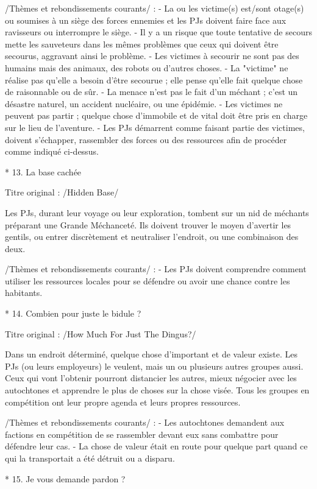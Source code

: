 \begin{enumerate}
/Thèmes et rebondissements courants/ :
- La ou les victime(s) est/sont otage(s) ou soumises à un siège des forces ennemies et les PJs doivent faire face aux ravisseurs ou interrompre le siège.
- Il y a un risque que toute tentative de secours mette les sauveteurs dans les mêmes problèmes que ceux qui doivent être secourus, aggravant ainsi le problème.
- Les victimes à secourir ne sont pas des humains mais des animaux, des robots ou d'autres choses.
- La "victime" ne réalise pas qu'elle a besoin d'être secourue ; elle pense qu'elle fait quelque chose de raisonnable ou de sûr.
- La menace n'est pas le fait d'un méchant ; c'est un désastre naturel, un accident nucléaire, ou une épidémie.
- Les victimes ne peuvent pas partir ; quelque chose d'immobile et de vital doit être pris en charge sur le lieu de l'aventure.
- Les PJs démarrent comme faisant partie des victimes, doivent s'échapper, rassembler des forces ou des ressources afin de procéder comme indiqué ci-dessus.

* 13. La base cachée

Titre original : /Hidden Base/

Les PJs, durant leur voyage ou leur exploration, tombent sur un nid de méchants préparant une Grande Méchanceté. Ils doivent trouver le moyen d'avertir les gentils, ou entrer discrètement et neutraliser l'endroit, ou une combinaison des deux.

/Thèmes et rebondissements courants/ :
- Les PJs doivent comprendre comment utiliser les ressources locales pour se défendre ou avoir une chance contre les habitants.

* 14. Combien pour juste le bidule ?

Titre original : /How Much For Just The Dingus?/

Dans un endroit déterminé, quelque chose d'important et de valeur existe. Les PJs (ou leurs employeurs) le veulent, mais un ou plusieurs autres groupes aussi. Ceux qui vont l'obtenir pourront distancier les autres, mieux négocier avec les autochtones et apprendre le plus de choses sur la chose visée. Tous les groupes en compétition ont leur propre agenda et leurs propres ressources.

/Thèmes et rebondissements courants/ :
- Les autochtones demandent aux factions en compétition de se rassembler devant eux sans combattre pour défendre leur cas.
- La chose de valeur était en route pour quelque part quand ce qui la transportait a été détruit ou a disparu.

* 15. Je vous demande pardon ?


\end{enumerate}
